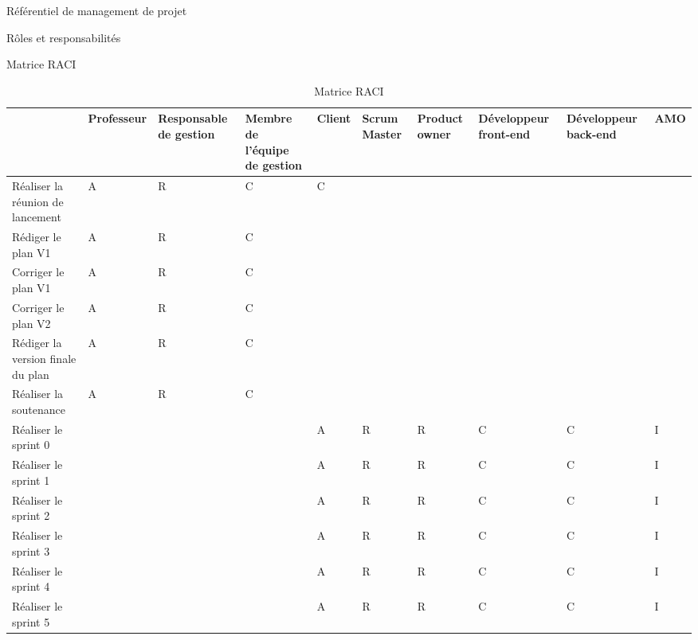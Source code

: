 \documentclass[]{article}
\begin{document}
{\begin{section}{\label{sec:Référentiel de management de projet}Référentiel de management de projet}
\begin{subsection}{\label{sec:Rôles et responsabilités}Rôles et responsabilités}
\begin{subsubsection}{\label{sec:Matrice RACI}Matrice RACI}
             \begin{landscape}
                \begin{table}[H]
                    \caption{Matrice RACI}
                    \fontsize{8pt}{9pt}\selectfont
                    \begin{tabularx}{\columnwidth}{|X|X|X|X|X|X|X|X|X|X|}
                        \hline
                        & Professeur & Responsable de gestion & Membre de l'équipe de gestion & Client & Scrum Master & Product owner & Développeur front-end & Développeur back-end & AMO\\
                        \hline
                        Réaliser la réunion de lancement & A & R & C & C &  &  &  &  & \\
                        \hline
                        Rédiger le plan V1& A & R & C &  &  &  &  &  & \\
                        \hline
                        Corriger le plan V1& A & R & C &  &  &  &  &  & \\
                        \hline
                        Corriger le plan V2& A & R & C  &  &  &  &  &  & \\
                        \hline
                        Rédiger la version finale du plan& A & R & C  &  &  &  &  &  & \\
                        \hline
                        Réaliser la soutenance& A & R & C  &  &  &  &  &  & \\
                        \hline
                        Réaliser le sprint 0&  &  &  & A & R & R & C & C & I\\
                        \hline
                        Réaliser le sprint 1&  &  &  & A & R & R & C & C & I\\
                        \hline
                        Réaliser le sprint 2&  &  &  & A & R & R & C & C & I\\
                        \hline
                        Réaliser le sprint 3&  &  &  & A & R & R & C & C & I\\
                        \hline
                        Réaliser le sprint 4&  &  &  & A & R & R & C & C & I\\
                        \hline
                        Réaliser le sprint 5&  &  &  & A & R & R & C & C & I\\
                        \hline
                    \end{tabularx}
                \end{table}
             \end{landscape}
         \end{subsubsection}
     \end{subsection}


\end{section}}
\end{document}
